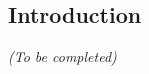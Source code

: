\subsection{Introduction}
\label{subsec:introduction_centrosomal}

\begin{center}
	\textit{(To be completed)}
\end{center}




